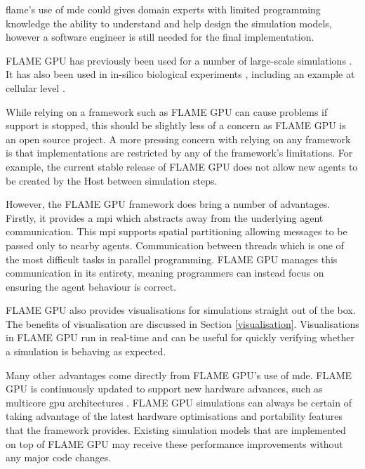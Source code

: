 \documentclass{UoYCSproject}
\begin{document}
\gls{flame}'s use of \gls{mde} could gives domain experts with limited programming knowledge the ability to understand and help design the simulation models, however a software engineer is still needed for the final implementation.


\gls{FLAME GPU} has previously been used for a number of large-scale simulations \cite{flame_pedestrian, flame_largescale}.
It has also been used in \gls{in-silico} biological experiments \cite{sperm_3d, maternal_interactions}, including an example at cellular level \cite{flame_keratinocyte}.

While relying on a framework such as \gls{FLAME GPU} can cause problems if support is stopped, this should be slightly less of a concern as \gls{FLAME GPU} is an open source project.
A more pressing concern with relying on any framework is that implementations are restricted by any of the framework's limitations.
For example, the current stable release of \gls{FLAME GPU} does not allow new agents to be created by the \gls{Host} between simulation steps.

However, the \gls{FLAME GPU} framework does bring a number of advantages.
Firstly, it provides a \gls{mpi} which abstracts away from the underlying agent communication.
This \gls{mpi} supports spatial partitioning allowing messages to be passed only to nearby agents.
Communication between threads which is one of the most difficult tasks in parallel programming.
\gls{FLAME GPU} manages this communication in its entirety, meaning programmers can instead focus on ensuring the agent behaviour is correct.

\gls{FLAME GPU} also provides visualisations for simulations straight out of the box.
The benefits of visualisation are discussed in Section \ref{visualisation}.
Visualisations in \gls{FLAME GPU} run in real-time and can be useful for quickly verifying whether a simulation is behaving as expected.

Many other advantages come directly from \gls{FLAME GPU}'s use of \gls{mde}.
\gls{FLAME GPU} is continuously updated to support new hardware advances, such as multicore \acrshort{gpu} architectures \cite{flame_simulation}.
\gls{FLAME GPU} simulations can always be certain of taking advantage of the latest hardware optimisations and portability features that the framework provides.
Existing simulation models that are implemented on top of \gls{FLAME GPU} may receive these performance improvements without any major code changes.
\end{document}
